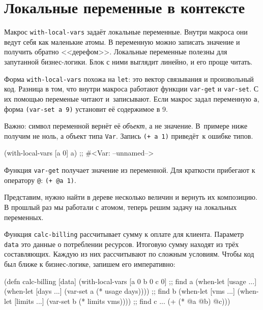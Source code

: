 \section{Локальные переменные в контексте}


Макрос \verb|with-local-vars| задаёт локальные переменные. Внутри макроса
они ведут себя как маленькие атомы. В переменную можно записать значение и
получить обратно <<дерефом>>. Локальные переменные полезны для запутанной
бизнес-логики. Блок с ними выглядит линейно, и его проще читать.

Форма \verb|with-local-vars| похожа на \verb|let|: это вектор связывания и
произвольный код. Разница в том, что внутри макроса работают функции
\verb|var-get| и \verb|var-set|. С их помощью переменые читают
и~записывают. Если макрос задал переменную \verb|a|, форма \verb|(var-set a 9)|
установит её содержимое в 9.

Важно: символ переменной вернёт её \emph{объект}, а не значение. В~примере ниже
получим не ноль, а объект типа \verb|Var|. Запись \verb|(+ a 1)| приведёт~к
ошибке типов.

\begin{english}
  \begin{clojure}
(with-local-vars [a 0] a)
;; #<Var: --unnamed-->
  \end{clojure}
\end{english}

Функция \verb|var-get| получает значение из переменной. Для краткости
прибегают к оператору \verb|@|: \verb|(+ @a 1)|.

Представим, нужно найти в дереве несколько величин и вернуть их композицию. В
прошлый раз мы работали с атомом, теперь решим задачу на локальных переменных.

Функция \verb|calc-billing| рассчитывает сумму к оплате для клиента. Параметр
\verb|data| это данные о потреблении ресурсов. Итоговую сумму находят из трёх
составляющих. Каждую из них рассчитывают по сложным условиям. Чтобы код был
ближе к бизнес-логике, запишем его императивно:

\begin{english}
  \begin{clojure}
(defn calc-billing [data]
  (with-local-vars
    [a 0 b 0 c 0]
    ;; find a
    (when-let [usage ...]
      (when-let [days ...]
        (var-set a (* usage days))))
    ;; find b
    (when-let [vms ...]
      (when-let [limits ...]
        (var-set b (* limits vms))))
    ;; find c ...
    (+ (* @a @b) @c)))
  \end{clojure}
\end{english}

